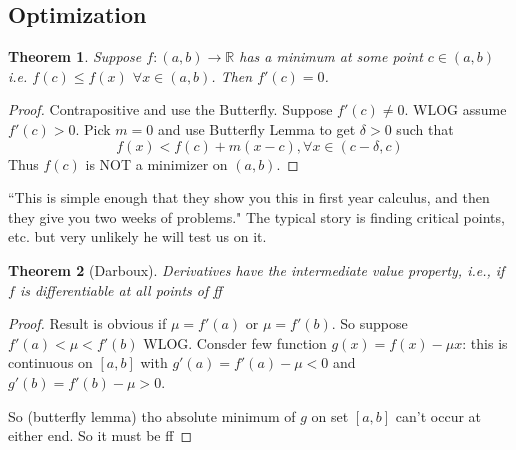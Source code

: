 \documentclass{article}
\theoremstyle{plain}
\newtheorem{theorem}{Theorem}
\theoremstyle{remark}
\newcommand{\R}{{\mathbb R}}
\begin{document}
\subsection{Optimization}
\begin{theorem}
	Suppose $f \colon (a,b) \to \R$ has a minimum
	at some point $c \in (a,b)$ i.e. $f(c) \leq f(x)$ $\forall x \in (a,b)$.
	Then $f'(c) = 0$.
\end{theorem}
\begin{proof}
	Contrapositive and use the Butterfly.
	Suppose $f'(c) \neq 0$. WLOG assume $f'(c) > 0$.
	Pick $m = 0$ and use Butterfly Lemma to get $\delta > 0$ such that
	\[
		f(x) < f(c) + m(x-c), \forall x \in (c-\delta, c)
	\]
	Thus $f(c)$ is NOT a minimizer on $(a,b)$.
\end{proof}
``This is simple enough that they show you this in first year calculus,
and then they give you two weeks of problems."
The typical story is finding critical points, etc.
but very unlikely he will test us on it.

\begin{theorem}[Darboux]
	Derivatives have the intermediate value property,
	i.e., if $f$ is differentiable at all points of ff
\end{theorem}
\begin{proof}
	Result is obvious if $\mu = f'(a)$ or $\mu = f'(b)$.
	So suppose $f'(a) < \mu < f'(b)$ WLOG.
	Consder few function $g(x) = f(x) - \mu x$:
	this is continuous on $[a,b]$ with $g'(a) = f'(a) - \mu < 0$
	and $g'(b) = f'(b) - \mu > 0$.

	So (butterfly lemma) tho absolute minimum of $g$
	on set $[a,b]$ can't occur at either end.
	So it must be ff
\end{proof}
\end{document}
